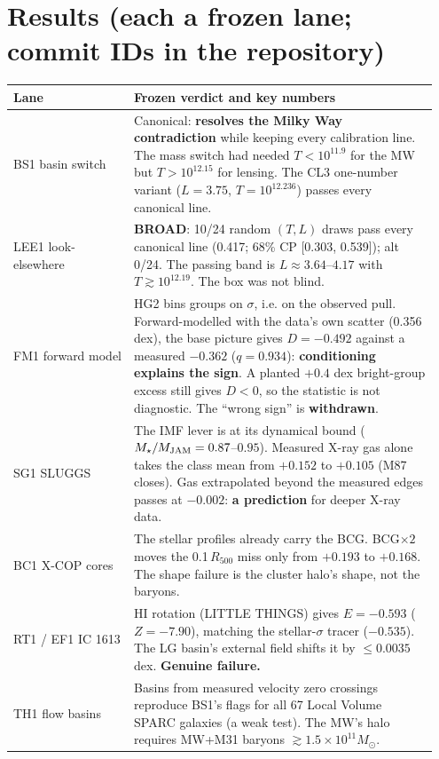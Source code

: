 \documentclass[10pt]{article}
\begin{document}
\section{Results (each a frozen lane; commit IDs in the repository)}
\begin{tabular}{@{}p{0.27\linewidth}p{0.68\linewidth}@{}}\toprule
Lane & Frozen verdict and key numbers \\ \midrule
BS1 basin switch & Canonical: \textbf{resolves the Milky Way contradiction} while keeping every calibration line. The mass switch had needed $T<10^{11.9}$ for the MW but $T>10^{12.15}$ for lensing. The CL3 one-number variant ($L=3.75$, $T=10^{12.236}$) passes every canonical line. \\
LEE1 look-elsewhere & \textbf{BROAD}: 10/24 random $(T,L)$ draws pass every canonical line (0.417; 68\% CP [0.303, 0.539]); alt 0/24. The passing band is $L\approx3.64$--$4.17$ with $T\gtrsim10^{12.19}$. The box was not blind. \\
FM1 forward model & HG2 bins groups on $\sigma$, i.e. on the observed pull. Forward-modelled with the data's own scatter (0.356 dex), the base picture gives $D=-0.492$ against a measured $-0.362$ ($q=0.934$): \textbf{conditioning explains the sign}. A planted $+0.4$ dex bright-group excess still gives $D<0$, so the statistic is not diagnostic. The ``wrong sign'' is \textbf{withdrawn}. \\
SG1 SLUGGS & The IMF lever is at its dynamical bound ($M_\star/M_{\rm JAM}=0.87$--$0.95$). Measured X-ray gas alone takes the class mean from $+0.152$ to $+0.105$ (M87 closes). Gas extrapolated beyond the measured edges passes at $-0.002$: \textbf{a prediction} for deeper X-ray data. \\
BC1 X-COP cores & The stellar profiles already carry the BCG. BCG$\times2$ moves the 0.1\,$R_{500}$ miss only from $+0.193$ to $+0.168$. The shape failure is the cluster halo's shape, not the baryons. \\
RT1 / EF1 IC 1613 & HI rotation (LITTLE THINGS) gives $E=-0.593$ ($Z=-7.90$), matching the stellar-$\sigma$ tracer ($-0.535$). The LG basin's external field shifts it by $\le0.0035$ dex. \textbf{Genuine failure.} \\
TH1 flow basins & Basins from measured velocity zero crossings reproduce BS1's flags for all 67 Local Volume SPARC galaxies (a weak test). The MW's halo requires MW+M31 baryons $\gtrsim1.5\times10^{11}M_\odot$. \\ \bottomrule
\end{tabular}
\end{document}
